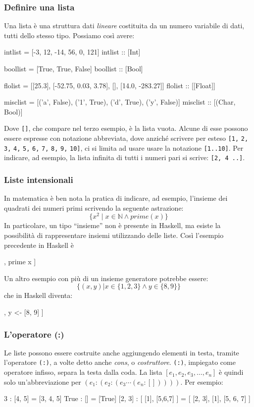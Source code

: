 \subsubsection{Definire una lista}
Una lista \`e una struttura dati \emph{lineare} costituita da 
un numero variabile di dati, tutti dello stesso tipo. Possiamo cos\`i
avere:
\begin{haskellCode}
intlist = [-3, 12, -14, 56, 0, 121]
intlist :: [Int]

boollist = [True, True, False]
boollist :: [Bool]

flolist = [[25.3], [-52.75, 0.03, 3.78], [], [14.0, -283.27]]
flolist :: [[Float]]

misclist = [('a', False), ('1', True), ('d', True), ('y', False)]
misclist :: [(Char, Bool)]
\end{haskellCode}
Dove \verb"[]", che compare nel terzo esempio, \`e la lista vuota.
Alcune di esse possono essere espresse con notazione abbreviata, dove 
anzich\'e scrivere per esteso \verb"[1," \verb"2," \verb"3," \verb"4," 
\verb"5," \verb"6," \verb"7," \verb"8," \verb"9," \verb"10]", ci si limita ad usare 
usare la notazione \verb"[1..10]". Per indicare, ad esempio, la lista infinita di tutti 
i numeri pari si scrive: \verb"[2, 4 ..]".

\subsubsection{Liste intensionali}
In matematica \`e ben nota la pratica di indicare, ad esempio, l'insieme 
dei quadrati dei numeri primi scrivendo la seguente astrazione: 
$$\{x^{2}\mid x \in \mathbb{N} \land prime(x)\}$$
In particolare, un tipo ``insieme'' non \`e presente in Haskell, ma esiste 
la possibilit\`a di rappresentare insiemi utilizzando delle
liste. Cos\`i l'esempio precedente in Haskell \`e
\begin{haskellCode}
[ x * x | x <- [1..], prime x ]
\end{haskellCode}
Un altro esempio con pi\`u di un insieme generatore potrebbe essere: $$\{(x,y)|x\in 
\{1,2,3\}\land y\in \{8,9\}\}$$ che in Haskell diventa:
\begin{haskellCode}
[ (x, y) | x <- [1, 2, 3], y <- [8, 9] ]
\end{haskellCode}

\subsubsection{L'operatore (:)}
Le liste possono essere costruite anche aggiungendo elementi in testa, 
tramite l'operatore \verb"(:)", a volte detto anche \emph{cons}, o 
\emph{costruttore}. \verb"(:)", impiegato come operatore infisso, separa 
la testa dalla coda. La lista $[e_{1},e_{2},e_{3},\ldots ,e_{n}]$ \`e quindi 
solo un'abbreviazione per $(e_{1}:(e_{2}:(e_{3}\cdots (e_n:[]))))$. Per 
esempio:
\begin{haskellCode}
3 : [4, 5]                   =   [3, 4, 5]
True : []                    =   [True]
[2, 3] : [ [1], [5,6,7] ]    =   [ [2, 3], [1], [5, 6, 7] ]
\end{haskellCode}

